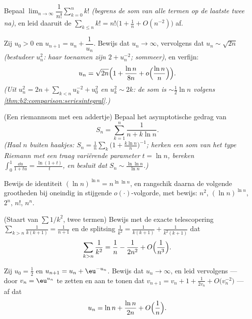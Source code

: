 \begin{exercise}[$\star\star$]\label{exo:b2:comparison:7}
Bepaal $\lim_{n\to\infty} \dfrac{1}{n!}\sum_{k=0}^{n} k!$
\emph{(begrens de som van alle termen op de laatste twee na)}, en
leid daaruit de  $\sum_{k \leq n} k! =
n!\bigl(1 + \frac1n + O(n^{-2})\bigr)$ af.
\end{exercise}

\begin{exercise}[$\star\star\star$]\label{exo:b2:comparison:8}
Zij $u_0 > 0$ en $u_{n+1} = u_n + \dfrac{1}{u_n}$. Bewijs dat $u_n
\to \infty$, vervolgens dat $u_n \sim \sqrt{2n}$ \emph{(bestudeer
$u_n^2$: haar toenamen zijn $2 + u_n^{-2}$; sommeer)}, en verfijn:
\[
u_n = \sqrt{2n}\Bigl(1 + \frac{\ln n}{8n} +
o\Bigl(\frac{\ln n}{n}\Bigr)\Bigr).
\]
\emph{(Uit $u_n^2 = 2n + \sum_{k<n} u_k^{-2} + u_0^2$ en $u_k^2
\sim 2k$: de som is $\sim \frac12\ln n$ volgens
\cref{thm:b2:comparison:seriesintegral}.)}
\end{exercise}

\begin{exercise}[$\star\star\star$]\label{exo:b2:comparison:9}
(Een riemannsom met een addertje) Bepaal het asymptotische gedrag
van
\[
S_n = \sum_{k=1}^{n} \frac{1}{n + k\ln n} .
\]
\emph{(Haal $n$ buiten haakjes: $S_n = \frac1n\sum_k \bigl(1 +
\frac{k\ln n}{n}\bigr)^{-1}$; herken een som van het type Riemann
met een traag variërende parameter $t = \ln n$, bereken $\int_0^1
\frac{\dd u}{1 + tu} = \frac{\ln(1+t)}{t}$, en besluit dat $S_n
\sim \frac{\ln\ln n}{\ln n}$.)}
\end{exercise}

\begin{exercise}[$\star$]\label{exo:b2:comparison:10}
Bewijs de identiteit $(\ln n)^{\ln n} = n^{\ln\ln n}$, en
rangschik daarna de volgende grootheden bij oneindig in stijgende
$o(\cdot)$-volgorde, met bewijs: $n^2$, $(\ln n)^{\ln n}$, $2^n$,
$n!$, $n^n$.
\end{exercise}

\begin{exercise}[$\star\star$]\label{exo:b2:comparison:11}
(Staart van $\sum 1/k^2$, twee termen) Bewijs met de exacte
telescopering $\sum_{k > n} \frac{1}{k(k+1)} = \frac{1}{n+1}$ en de
splitsing $\frac1{k^2} = \frac{1}{k(k+1)} + \frac{1}{k^2(k+1)}$
dat
\[
\sum_{k > n} \frac{1}{k^2}
= \frac1n - \frac{1}{2n^2} + O\Bigl(\frac{1}{n^3}\Bigr).
\]
\end{exercise}

\begin{exercise}[$\star\star\star$]\label{exo:b2:comparison:12}
Zij $u_0 = \frac12$ en $u_{n+1} = u_n + \eu^{-u_n}$. Bewijs dat
$u_n \to \infty$, en leid vervolgens --- door $v_n = \eu^{u_n}$ te
zetten en aan te tonen dat $v_{n+1} = v_n + 1 + \frac{1}{2v_n} +
O\bigl(v_n^{-2}\bigr)$ --- af dat
\[
u_n = \ln n + \frac{\ln n}{2n} + O\Bigl(\frac1n\Bigr).
\]
\end{exercise}

